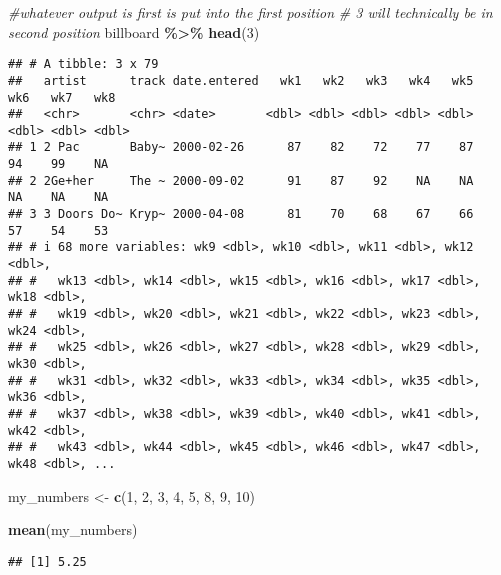 \documentclass[
]{article}
\newenvironment{Shaded}{\begin{snugshade}}{\end{snugshade}}
\newcommand{\CommentTok}[1]{\textcolor[rgb]{0.56,0.35,0.01}{\textit{#1}}}
\newcommand{\DecValTok}[1]{\textcolor[rgb]{0.00,0.00,0.81}{#1}}
\newcommand{\FunctionTok}[1]{\textcolor[rgb]{0.13,0.29,0.53}{\textbf{#1}}}
\newcommand{\NormalTok}[1]{#1}
\newcommand{\OtherTok}[1]{\textcolor[rgb]{0.56,0.35,0.01}{#1}}
\newcommand{\SpecialCharTok}[1]{\textcolor[rgb]{0.81,0.36,0.00}{\textbf{#1}}}
\begin{document}
\begin{Shaded}
\begin{Highlighting}[]
\CommentTok{\#whatever output is first is put into the first position}
\CommentTok{\# 3 will technically be in second position}
\NormalTok{billboard }\SpecialCharTok{\%\textgreater{}\%}
  \FunctionTok{head}\NormalTok{(}\DecValTok{3}\NormalTok{)}
\end{Highlighting}
\end{Shaded}

\begin{verbatim}
## # A tibble: 3 x 79
##   artist      track date.entered   wk1   wk2   wk3   wk4   wk5   wk6   wk7   wk8
##   <chr>       <chr> <date>       <dbl> <dbl> <dbl> <dbl> <dbl> <dbl> <dbl> <dbl>
## 1 2 Pac       Baby~ 2000-02-26      87    82    72    77    87    94    99    NA
## 2 2Ge+her     The ~ 2000-09-02      91    87    92    NA    NA    NA    NA    NA
## 3 3 Doors Do~ Kryp~ 2000-04-08      81    70    68    67    66    57    54    53
## # i 68 more variables: wk9 <dbl>, wk10 <dbl>, wk11 <dbl>, wk12 <dbl>,
## #   wk13 <dbl>, wk14 <dbl>, wk15 <dbl>, wk16 <dbl>, wk17 <dbl>, wk18 <dbl>,
## #   wk19 <dbl>, wk20 <dbl>, wk21 <dbl>, wk22 <dbl>, wk23 <dbl>, wk24 <dbl>,
## #   wk25 <dbl>, wk26 <dbl>, wk27 <dbl>, wk28 <dbl>, wk29 <dbl>, wk30 <dbl>,
## #   wk31 <dbl>, wk32 <dbl>, wk33 <dbl>, wk34 <dbl>, wk35 <dbl>, wk36 <dbl>,
## #   wk37 <dbl>, wk38 <dbl>, wk39 <dbl>, wk40 <dbl>, wk41 <dbl>, wk42 <dbl>,
## #   wk43 <dbl>, wk44 <dbl>, wk45 <dbl>, wk46 <dbl>, wk47 <dbl>, wk48 <dbl>, ...
\end{verbatim}

\begin{Shaded}
\begin{Highlighting}[]
\NormalTok{my\_numbers }\OtherTok{\textless{}{-}} \FunctionTok{c}\NormalTok{(}\DecValTok{1}\NormalTok{, }\DecValTok{2}\NormalTok{, }\DecValTok{3}\NormalTok{, }\DecValTok{4}\NormalTok{, }\DecValTok{5}\NormalTok{, }\DecValTok{8}\NormalTok{, }\DecValTok{9}\NormalTok{, }\DecValTok{10}\NormalTok{)}
\end{Highlighting}
\end{Shaded}

\begin{Shaded}
\begin{Highlighting}[]
\FunctionTok{mean}\NormalTok{(my\_numbers)}
\end{Highlighting}
\end{Shaded}

\begin{verbatim}
## [1] 5.25
\end{verbatim}
\end{document}
